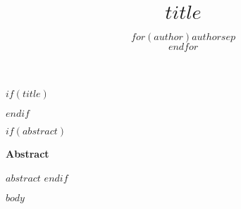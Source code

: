 \documentclass[11pt]{article}
\title{\Large\bfseries $title$}
\author{$for(author)$$author$$sep$\\$endfor$}
\date{}
\renewenvironment{abstract}{%
\small
\begin{center}
\textbf{Abstract}\vspace{-10pt}\vspace{0pt}
\end{center}
\quotation
}{\endquotation\vspace{10pt}}
\begin{document}
$if(title)$
\maketitle
\vspace{-15pt}
$endif$

$if(abstract)$
\begin{abstract}
$abstract$
\end{abstract}
$endif$

$body$
\end{document}
